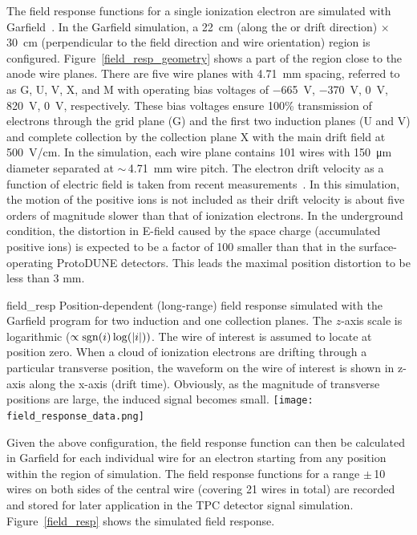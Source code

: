 The field response functions for a single ionization electron are simulated with Garfield~\cite{garfield}. 
In the Garfield simulation, a \SI{22}{cm} (along the \efield or drift direction) $\times$ 
\SI{30}{cm} (perpendicular to the field direction and wire orientation) region is configured.  
Figure~\ref{field_resp_geometry} shows a part of the region close to the anode wire planes. There are five wire planes with \SI{4.71}{mm} spacing, referred to as G, U, V, X, and 
M with operating bias voltages of \SI{-665}{V}, \SI{-370}{V}, \SI{0}{V}, \SI{820}{V}, \SI{0}{V}, respectively.  
These bias voltages ensure 100\% transmission of electrons through the grid plane (G) and the 
first two induction planes (U and V) and complete collection by the collection plane X with the main drift 
field at \SI{500}{V/cm}. In the simulation, each wire plane contains 101 wires with \SI{150}{\micro\meter} diameter
  separated at $\sim\,$\SI{4.71}{\mm} wire pitch. The electron drift velocity as a function of electric
  field is taken from recent measurements~\cite{Li:2015rqa,larpropertiesbnl}. In this simulation, the motion of the positive ions is not included as their drift velocity is about five orders of magnitude slower than that of ionization electrons. In the underground condition, the distortion in E-field caused by the space charge (accumulated positive ions) is expected to be a factor of 100 smaller than that in the surface-operating ProtoDUNE detectors. This leads the maximal position distortion to be less than 3 mm. 
\begin{dunefigure}
{field_resp}
{Position-dependent (long-range) field response simulated with the Garfield program 
for two induction and one collection planes.
The $z$-axis scale is logarithmic ($\propto{\rm sgn}(i)\log(|i|))$.
The wire of interest 
is assumed to locate at position zero. When a cloud of ionization electrons are drifting through a particular transverse position, the waveform on the wire of interest is shown in z-axis along the x-axis (drift time). Obviously, as the magnitude of transverse positions are large, the induced signal becomes small.}
\texttt{[image: field\_response\_data.png]}
\end{dunefigure}


 Given the above configuration, the field response function can then be calculated in Garfield
  for each individual wire  for an
  electron starting from any position within the region of simulation. 
  The field response functions for a range $\pm\,$10 wires on both sides of the central wire (covering 21 wires in total) are 
  recorded and stored for later
  application in the TPC detector signal simulation.
  Figure~\ref{field_resp} shows the simulated field response.
  

